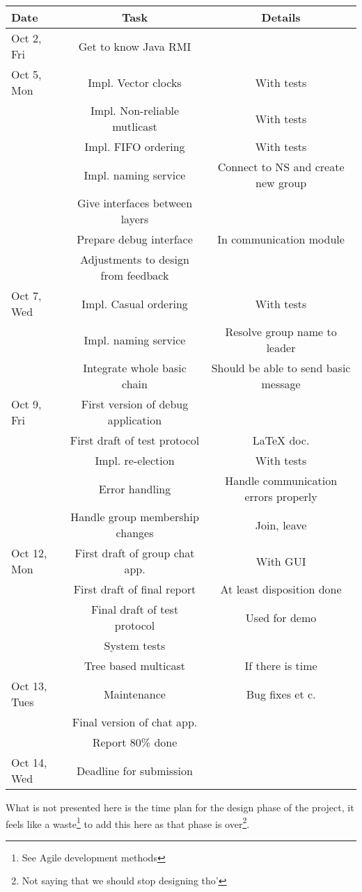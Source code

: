 		\begin{tabular}{lcc}
			\centering
			\textbf{Date} & \textbf{Task} & \textbf{Details} \\
			\hline
			Oct 2, Fri & Get to know Java RMI \\
			\hline
			Oct 5, Mon & Impl. Vector clocks & With tests \\
			& Impl. Non-reliable mutlicast & With tests \\
			& Impl. FIFO ordering & With tests \\
			& Impl. naming service & Connect to NS and create new group \\
			& Give interfaces between layers &  \\
			& Prepare debug interface & In communication module \\
			& Adjustments to design from feedback & \\
			\hline
			Oct 7, Wed & Impl. Casual ordering & With tests \\
			& Impl. naming service & Resolve group name to leader \\
			& Integrate whole basic chain & Should be able to send basic message \\
			\hline
			Oct 9, Fri & First version of debug application &  \\
			& First draft of test protocol & LaTeX doc. \\
			& Impl. re-election & With tests \\
			& Error handling & Handle communication errors properly \\
			& Handle group membership changes & Join, leave \\
			\hline
			Oct 12, Mon & First draft of group chat app. & With GUI \\
			& First draft of final report & At least disposition done \\
			& Final draft of test protocol & Used for demo \\
			& System tests & \\
			& Tree based multicast & If there is time \\
			\hline
			Oct 13, Tues & Maintenance & Bug fixes et c.\\
			& Final version of chat app. & \\
			& Report 80\% done & \\
			\hline
			Oct 14, Wed & Deadline for submission & \\

		\end{tabular}

		What is not presented here is the time plan for the design phase of the project, it feels like a waste\footnote{See Agile development methods} to add this here as that phase is over\footnote{Not saying that we should stop designing tho'}.
